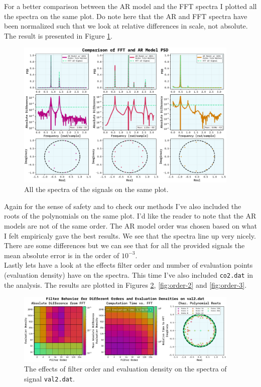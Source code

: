 \documentclass[10pt, titlepage, a4paper]{article}
\begin{document}
For a better comparison between the AR model and the FFT spectra I plotted all the spectra on the same plot. Do note here that 
the AR and FFT spectra have been normalized such that we look at relative differences in scale, not absolute. The result 
is presented in Figure \ref{fig:all-spectra}.

\begin{figure}[H]
    \centering
    \includegraphics[width=0.95\textwidth]{../MaxEntropy/Images/fft-ar-model-compare.pdf}
    \caption{All the spectra of the signals on the same plot.}
    \label{fig:all-spectra}
\end{figure}

Again for the sense of safety and to check our methods I've also included the roots of the polynomials on the same plot.
I'd like the reader to note that the AR models are not of the same order. The AR model order was chosen based on what I felt 
empiricaly gave the best results. We see that the spectra line up very nicely. There are some differences but we can see 
that for all the provided signals the mean absolute error is in the order of $10^{-3}$. \\ 

Lastly lets have a look at the effects filter order and number of evaluation points (evaluation density) have on the
spectra. This time I've also included \texttt{co2.dat} in the analysis. The results are plotted in Figures 
\ref{fig:order-1}, \ref{fig:order-2} and \ref{fig:order-3}. 

\begin{figure}[H]
    \centering
    \includegraphics[width=0.95\textwidth]{../MaxEntropy/Images/order-density-val2.dat.pdf}
    \caption{The effects of filter order and evaluation density on the spectra of signal \texttt{val2.dat}.}
    \label{fig:order-1}
\end{figure}
\end{document}
